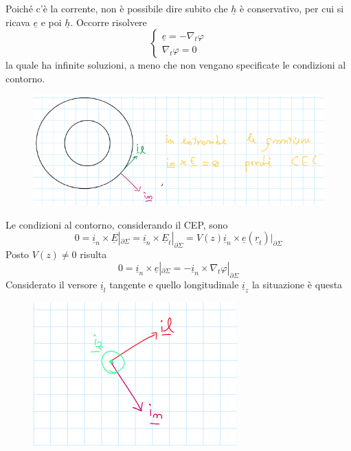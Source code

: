 \documentclass{book}
\begin{document}
        Poiché c'è la corrente, non è possibile dire subito che $\underline{h}$ è conservativo, per cui si ricava $\underline{e}$ e poi $\underline{h}$. Occorre risolvere 
        \begin{equation}
            \begin{cases}
                \underline{e} = - \nabla_{t} \varphi \\
                \nabla_{t} \varphi = 0
            \end{cases}
        \end{equation}
        la quale ha infinite soluzioni, a meno che non vengano specificate le condizioni al contorno.
        \begin{figure}[h!]
            \center  
            \includegraphics[width=0.6\linewidth]{img/Chapter_three/Chapt3img5.png}
        \end{figure}
        Le condizioni al contorno, considerando il CEP, sono
        \begin{equation}
            0 = \underline{i}_{n} \times \underline{E}|_{\partial \Sigma} = \underline{i}_{n} \times \underline{E}_{t}|_{\partial \Sigma} = V(z)\underline{i}_{n} \times \underline{e}(\underline{r}_{t})|_{\partial \Sigma}
        \end{equation}
        Posto $V(z) \neq 0$ risulta
        \begin{equation}
            0 = \underline{i}_{n} \times \underline{e}|_{\partial \Sigma}  = - \underline{i}_{n} \times \nabla_{t} \varphi |_{\partial \Sigma}
        \end{equation}
        Considerato il versore $\underline{i}_{l}$ tangente e quello longitudinale $\underline{i}_{z}$ la situazione è questa
        \begin{figure}
            \center  
            \includegraphics[width=0.6\linewidth]{img/Chapter_three/Chapt3img6.png}
        \end{figure}
\end{document}
